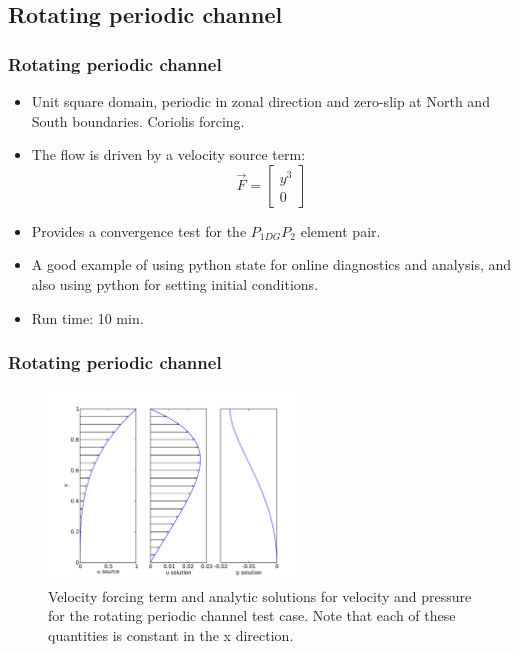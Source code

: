 \subsection{Rotating periodic channel}

\begin{frame}
    \frametitle{Rotating periodic channel}
\begin{itemize}
\item Unit square domain, periodic in zonal direction and zero-slip at North and South boundaries.  Coriolis forcing.
\item The flow is driven by a velocity source term:
\begin{equation*}
  \vec{F}=
  \begin{bmatrix}
    y^3 \\
    0
  \end{bmatrix}
\end{equation*}
\item Provides a convergence test for the $P_{1DG}P_2$ element pair.
\item A good example of using python state for online diagnostics and analysis, and also using python for setting initial conditions.
\item Run time: 10 min. 
\end{itemize}
\end{frame}
%
\begin{frame}
    \frametitle{Rotating periodic channel}
\begin{figure}
\includegraphics[width=0.6\textwidth]{./rotating_channel/analytic_solution}
\caption{Velocity forcing term and analytic solutions for velocity and pressure for the rotating periodic channel test case. Note that each of these quantities is constant in the x direction.}
\end{figure}
\end{frame}
